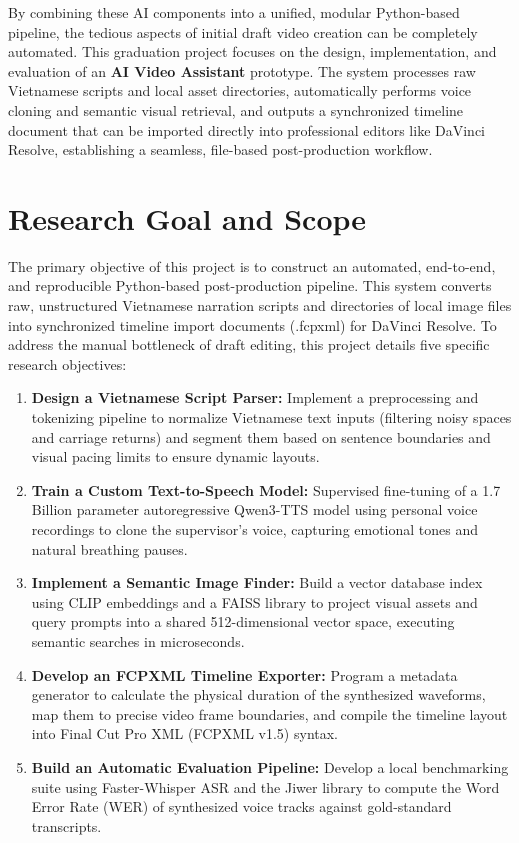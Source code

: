 \documentclass[a4paper,12pt]{report}
\begin{document}
By combining these AI components into a unified, modular Python-based pipeline, the tedious aspects of initial draft video creation can be completely automated. This graduation project focuses on the design, implementation, and evaluation of an \textbf{AI Video Assistant} prototype. The system processes raw Vietnamese scripts and local asset directories, automatically performs voice cloning and semantic visual retrieval, and outputs a synchronized timeline document that can be imported directly into professional editors like DaVinci Resolve, establishing a seamless, file-based post-production workflow.

\section{Research Goal and Scope}
The primary objective of this project is to construct an automated, end-to-end, and reproducible Python-based post-production pipeline. This system converts raw, unstructured Vietnamese narration scripts and directories of local image files into synchronized timeline import documents (.fcpxml) for DaVinci Resolve. To address the manual bottleneck of draft editing, this project details five specific research objectives:
\begin{enumerate}
    \item \textbf{Design a Vietnamese Script Parser:} Implement a preprocessing and tokenizing pipeline to normalize Vietnamese text inputs (filtering noisy spaces and carriage returns) and segment them based on sentence boundaries and visual pacing limits to ensure dynamic layouts.
    \item \textbf{Train a Custom Text-to-Speech Model:} Supervised fine-tuning of a 1.7 Billion parameter autoregressive Qwen3-TTS model using personal voice recordings to clone the supervisor's voice, capturing emotional tones and natural breathing pauses.
    \item \textbf{Implement a Semantic Image Finder:} Build a vector database index using CLIP embeddings and a FAISS library to project visual assets and query prompts into a shared 512-dimensional vector space, executing semantic searches in microseconds.
    \item \textbf{Develop an FCPXML Timeline Exporter:} Program a metadata generator to calculate the physical duration of the synthesized waveforms, map them to precise video frame boundaries, and compile the timeline layout into Final Cut Pro XML (FCPXML v1.5) syntax.
    \item \textbf{Build an Automatic Evaluation Pipeline:} Develop a local benchmarking suite using Faster-Whisper ASR and the Jiwer library to compute the Word Error Rate (WER) of synthesized voice tracks against gold-standard transcripts.
\end{enumerate}
\end{document}

